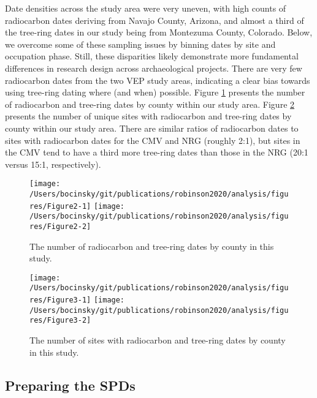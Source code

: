 \documentclass[
]{sa}
\begin{document}
Date densities across the study area were very uneven, with high counts of radiocarbon dates deriving from Navajo County, Arizona, and almost a third of the tree-ring dates in our study being from Montezuma County, Colorado. Below, we overcome some of these sampling issues by binning dates by site and occupation phase. Still, these disparities likely demonstrate more fundamental differences in research design across archaeological projects. There are very few radiocarbon dates from the two VEP study areas, indicating a clear bias towards using tree-ring dating where (and when) possible. Figure \ref{fig:Figure2} presents the number of radiocarbon and tree-ring dates by county within our study area. Figure \ref{fig:Figure3} presents the number of unique sites with radiocarbon and tree-ring dates by county within our study area. There are similar ratios of radiocarbon dates to sites with radiocarbon dates for the CMV and NRG (roughly 2:1), but sites in the CMV tend to have a third more tree-ring dates than those in the NRG (20:1 versus 15:1, respectively).

\begin{figure}

{\centering \texttt{[image: /Users/bocinsky/git/publications/robinson2020/analysis/figures/Figure2-1]} \texttt{[image: /Users/bocinsky/git/publications/robinson2020/analysis/figures/Figure2-2]} 

}

\caption{The number of radiocarbon and tree-ring dates by county in this study.}\label{fig:Figure2}
\end{figure}

\begin{figure}

{\centering \texttt{[image: /Users/bocinsky/git/publications/robinson2020/analysis/figures/Figure3-1]} \texttt{[image: /Users/bocinsky/git/publications/robinson2020/analysis/figures/Figure3-2]} 

}

\caption{The number of sites with radiocarbon and tree-ring dates by county in this study.}\label{fig:Figure3}
\end{figure}

\hypertarget{preparing-the-spds}{%
\subsection*{Preparing the SPDs}\label{preparing-the-spds}}
\end{document}
